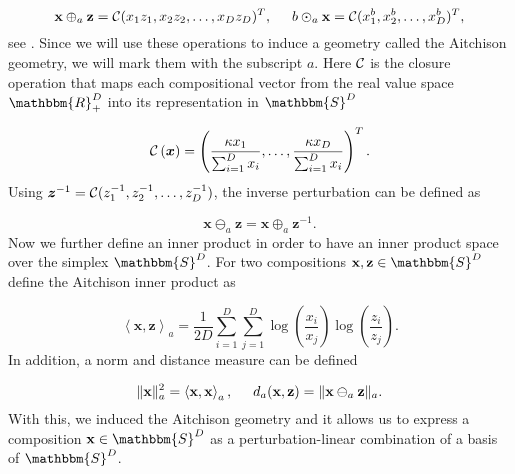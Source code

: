 \begin{equation}
\textbf{x}\oplus_a \textbf{z} = \mathcal{C}(x_1z_1,x_2z_2,\ldots,x_Dz_D)^T, \hspace{0.5cm} b \odot_a \textbf{x} = \mathcal{C}(x_1^b,x_2^b,\ldots,x_D^b)^T,
\label{eq:Simplex Operationen}
\end{equation}
%
see \textcite{Kynclova:2015}. Since we will use these operations to induce a geometry called the Aitchison geometry, we will mark them with the subscript $a$. Here $\mathcal{C}$ is the closure operation that maps each compositional vector from the real value space $\mathbbm{R}_+^D$ into its representation in $\mathbbm{S}^D$

\begin{equation}
\mathcal{C} \left(\bm{x}\right) = \left(\frac{\kappa x_1}{\sum_{i=1}^D x_i},\ldots, \frac{\kappa x_D}{\sum_{i=1}^D x_i}\right)^T.
\label{eq:Closure Operation}
\end{equation}
%
Using $\bm{z}^{-1} = \mathcal{C}(z_1^{-1},z_2^{-1},\ldots,z_D^{-1})$, the inverse perturbation can be defined as 

\begin{equation}
\textbf{x} \ominus_a \textbf{z} = \textbf{x} \oplus_a \textbf{z}^{-1}.
\label{eq: Inverse Perturbation}
\end{equation}
%
Now we further define an inner product in order to have an inner product space over the simplex $\mathbbm{S}^D$. For two compositions $\textbf{x},\textbf{z} \in \mathbbm{S}^D$ define the Aitchison inner product as 

\begin{equation}
\left\langle \textbf{x},\textbf{z} \right\rangle_a = \frac{1}{2D}\sum_{i=1}^{D}\sum_{j=1}^{D}\log(\frac{x_i}{x_j})\log(\frac{z_i}{z_j}).
\label{eq:Aitchon inner product}
\end{equation}
%
In addition, a norm and distance measure can be defined

\begin{equation}
\lVert\textbf{x}\rVert_a^2 = \left\langle  \textbf{x},\textbf{x} \right\rangle_a, \hspace{0.5cm} d_a(\textbf{x},\textbf{z}) = \lVert\textbf{x} \ominus_a \textbf{z}\rVert_a.
\label{eq:Simplex Norm and Distance}
\end{equation}
%
With this, we induced the Aitchison geometry and it allows us to express a composition $\textbf{x} \in \mathbbm{S}^D$ as a perturbation-linear combination of a basis of $\mathbbm{S}^D$.

